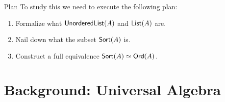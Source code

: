 \documentclass[9pt]{beamer}
\newcommand{\Ord}{\term{Ord}}
\newcommand{\setmtol}{\term{UL2L}}
\newcommand{\Sort}{\term{Sort}}
\newcommand{\otof}{\term{o2f}}
\newcommand{\List}{\term{List}}
\begin{document}
\begin{frame}{Plan}
  To study this we need to execute the following plan:
  \begin{enumerate}
    \item Formalize what \alert{$\operatorname{\mathsf{UnorderedList}}(A)$} and \alert{$\List(A)$} are.
\item Nail down what the \alert{subset $\Sort(A)$} is.
\item Construct a \alert{full equivalence} $\Sort(A) \simeq \Ord(A)$.
  \end{enumerate}
\end{frame}

\section{Background: Universal Algebra}
\end{document}
